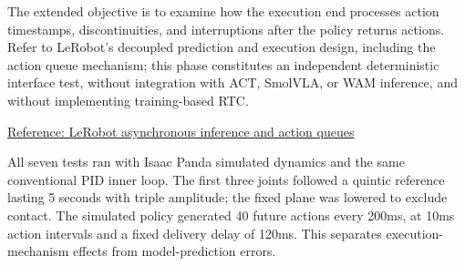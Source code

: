 The extended objective is to examine how the execution end processes action timestamps, discontinuities, and interruptions after the policy returns actions. Refer to LeRobot's decoupled prediction and execution design, including the action queue mechanism; this phase constitutes an independent deterministic interface test, without integration with ACT, SmolVLA, or WAM inference, and without implementing training-based RTC.

\href{https://huggingface.co/docs/lerobot/async}{Reference: LeRobot asynchronous inference and action queues}

All seven tests ran with Isaac Panda simulated dynamics and the same conventional PID inner loop. The first three joints followed a quintic reference lasting 5 seconds with triple amplitude; the fixed plane was lowered to exclude contact. The simulated policy generated 40 future actions every 200ms, at 10ms action intervals and a fixed delivery delay of 120ms. This separates execution-mechanism effects from model-prediction errors.

